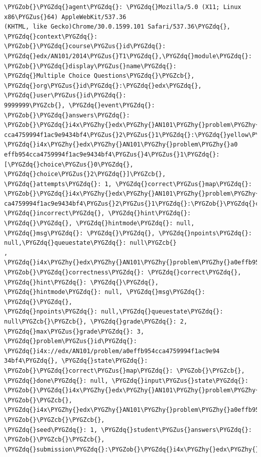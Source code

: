\documentclass[a4paper,12pt,oneside]{sphinxmanual}
\def\PYGZus{\char`\_}
\def\PYGZob{\char`\{}
\def\PYGZcb{\char`\}}
\def\PYGZhy{\char`\-}
\def\PYGZdq{\char`\"}
\begin{document}
\begin{Verbatim}[commandchars=\\\{\}]
\PYGZob{}\PYGZdq{}agent\PYGZdq{}: \PYGZdq{}Mozilla/5.0 (X11; Linux x86\PYGZus{}64) AppleWebKit/537.36
(KHTML, like Gecko)Chrome/30.0.1599.101 Safari/537.36\PYGZdq{}, \PYGZdq{}context\PYGZdq{}:
\PYGZob{}\PYGZdq{}course\PYGZus{}id\PYGZdq{}: \PYGZdq{}edx/AN101/2014\PYGZus{}T1\PYGZdq{},\PYGZdq{}module\PYGZdq{}: \PYGZob{}\PYGZdq{}display\PYGZus{}name\PYGZdq{}:
\PYGZdq{}Multiple Choice Questions\PYGZdq{}\PYGZcb{}, \PYGZdq{}org\PYGZus{}id\PYGZdq{}:\PYGZdq{}edx\PYGZdq{}, \PYGZdq{}user\PYGZus{}id\PYGZdq{}:
9999999\PYGZcb{}, \PYGZdq{}event\PYGZdq{}: \PYGZob{}\PYGZdq{}answers\PYGZdq{}: \PYGZob{}\PYGZdq{}i4x\PYGZhy{}edx\PYGZhy{}AN101\PYGZhy{}problem\PYGZhy{}a0effb954
cca4759994f1ac9e9434bf4\PYGZus{}2\PYGZus{}1\PYGZdq{}:\PYGZdq{}yellow\PYGZdq{}, \PYGZdq{}i4x\PYGZhy{}edx\PYGZhy{}AN101\PYGZhy{}problem\PYGZhy{}a0
effb954cca4759994f1ac9e9434bf4\PYGZus{}4\PYGZus{}1\PYGZdq{}: [\PYGZdq{}choice\PYGZus{}0\PYGZdq{}, \PYGZdq{}choice\PYGZus{}2\PYGZdq{}]\PYGZcb{},
\PYGZdq{}attempts\PYGZdq{}: 1, \PYGZdq{}correct\PYGZus{}map\PYGZdq{}: \PYGZob{}\PYGZdq{}i4x\PYGZhy{}edx\PYGZhy{}AN101\PYGZhy{}problem\PYGZhy{}a0effb954c
ca4759994f1ac9e9434bf4\PYGZus{}2\PYGZus{}1\PYGZdq{}:\PYGZob{}\PYGZdq{}correctness\PYGZdq{}: \PYGZdq{}incorrect\PYGZdq{}, \PYGZdq{}hint\PYGZdq{}:
\PYGZdq{}\PYGZdq{}, \PYGZdq{}hintmode\PYGZdq{}: null, \PYGZdq{}msg\PYGZdq{}: \PYGZdq{}\PYGZdq{}, \PYGZdq{}npoints\PYGZdq{}: null,\PYGZdq{}queuestate\PYGZdq{}: null\PYGZcb{}
, \PYGZdq{}i4x\PYGZhy{}edx\PYGZhy{}AN101\PYGZhy{}problem\PYGZhy{}a0effb954cca4759994f1ac9e9434bf4\PYGZus{}4\PYGZus{}1\PYGZdq{}:
\PYGZob{}\PYGZdq{}correctness\PYGZdq{}: \PYGZdq{}correct\PYGZdq{}, \PYGZdq{}hint\PYGZdq{}: \PYGZdq{}\PYGZdq{}, \PYGZdq{}hintmode\PYGZdq{}: null, \PYGZdq{}msg\PYGZdq{}: \PYGZdq{}\PYGZdq{},
\PYGZdq{}npoints\PYGZdq{}: null,\PYGZdq{}queuestate\PYGZdq{}: null\PYGZcb{}\PYGZcb{}, \PYGZdq{}grade\PYGZdq{}: 2, \PYGZdq{}max\PYGZus{}grade\PYGZdq{}: 3,
\PYGZdq{}problem\PYGZus{}id\PYGZdq{}: \PYGZdq{}i4x://edx/AN101/problem/a0effb954cca4759994f1ac9e94
34bf4\PYGZdq{}, \PYGZdq{}state\PYGZdq{}: \PYGZob{}\PYGZdq{}correct\PYGZus{}map\PYGZdq{}: \PYGZob{}\PYGZcb{}, \PYGZdq{}done\PYGZdq{}: null, \PYGZdq{}input\PYGZus{}state\PYGZdq{}:
\PYGZob{}\PYGZdq{}i4x\PYGZhy{}edx\PYGZhy{}AN101\PYGZhy{}problem\PYGZhy{}a0effb954cca4759994f1ac9e9434bf4\PYGZus{}2\PYGZus{}1\PYGZdq{}: \PYGZob{}\PYGZcb{},
\PYGZdq{}i4x\PYGZhy{}edx\PYGZhy{}AN101\PYGZhy{}problem\PYGZhy{}a0effb954cca4759994f1ac9e9434bf4\PYGZus{}4\PYGZus{}1\PYGZdq{}: \PYGZob{}\PYGZcb{}\PYGZcb{},
\PYGZdq{}seed\PYGZdq{}: 1, \PYGZdq{}student\PYGZus{}answers\PYGZdq{}: \PYGZob{}\PYGZcb{}\PYGZcb{}, \PYGZdq{}submission\PYGZdq{}:\PYGZob{}\PYGZdq{}i4x\PYGZhy{}edx\PYGZhy{}AN101\PYGZhy{}

\end{Verbatim}
\end{document}
